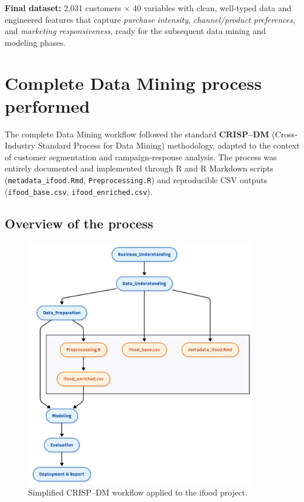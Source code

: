 \noindent
\textbf{Final dataset:} 2,031 customers $\times$ 40 variables with clean,
well-typed data and engineered features that capture \textit{purchase intensity},
\textit{channel/product preferences}, and \textit{marketing responsiveness},
ready for the subsequent data mining and modeling phases.


\newpage
\section{Complete Data Mining process performed}

The complete Data Mining workflow followed the standard \textbf{CRISP--DM}
(Cross‐Industry Standard Process for Data Mining) methodology, adapted to the
context of customer segmentation and campaign‐response analysis.  
The process was entirely documented and implemented through R and R Markdown scripts
(\texttt{metadata\_ifood.Rmd}, \texttt{Preprocessing.R}) and reproducible
CSV outputs (\texttt{ifood\_base.csv}, \texttt{ifood\_enriched.csv}).

\subsection{Overview of the process}

\begin{figure}[H]
    \centering
    \includegraphics[width=0.9\textwidth]{Imatges/workflow_datamining.png}
    \caption{Simplified CRISP--DM workflow applied to the ifood project.}
    \label{fig:workflow_dm}
\end{figure}

